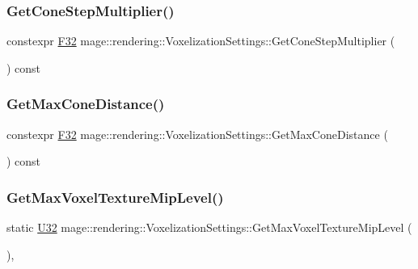 \subsubsection{\texorpdfstring{Get\+Cone\+Step\+Multiplier()}{GetConeStepMultiplier()}}
{\footnotesize\ttfamily constexpr \hyperlink{namespacemage_aa97e833b45f06d60a0a9c4fc22ae02c0}{F32} mage\+::rendering\+::\+Voxelization\+Settings\+::\+Get\+Cone\+Step\+Multiplier (\begin{DoxyParamCaption}{ }\end{DoxyParamCaption}) const\hspace{0.3cm}{\ttfamily [noexcept]}}

\hypertarget{classmage_1_1rendering_1_1_voxelization_settings_aa79b36e2c7ef50513548512f2cedfb6b}{}\label{classmage_1_1rendering_1_1_voxelization_settings_aa79b36e2c7ef50513548512f2cedfb6b} 
\subsubsection{\texorpdfstring{Get\+Max\+Cone\+Distance()}{GetMaxConeDistance()}}
{\footnotesize\ttfamily constexpr \hyperlink{namespacemage_aa97e833b45f06d60a0a9c4fc22ae02c0}{F32} mage\+::rendering\+::\+Voxelization\+Settings\+::\+Get\+Max\+Cone\+Distance (\begin{DoxyParamCaption}{ }\end{DoxyParamCaption}) const\hspace{0.3cm}{\ttfamily [noexcept]}}

\hypertarget{classmage_1_1rendering_1_1_voxelization_settings_aacf64e0e4be2e7260793dfefe7f332cb}{}\label{classmage_1_1rendering_1_1_voxelization_settings_aacf64e0e4be2e7260793dfefe7f332cb} 
\subsubsection{\texorpdfstring{Get\+Max\+Voxel\+Texture\+Mip\+Level()}{GetMaxVoxelTextureMipLevel()}}
{\footnotesize\ttfamily static \hyperlink{namespacemage_a41c104c036fba3756a74e19f793eeaa1}{U32} mage\+::rendering\+::\+Voxelization\+Settings\+::\+Get\+Max\+Voxel\+Texture\+Mip\+Level (\begin{DoxyParamCaption}{ }\end{DoxyParamCaption})\hspace{0.3cm}{\ttfamily [static]}, {\ttfamily [noexcept]}}

